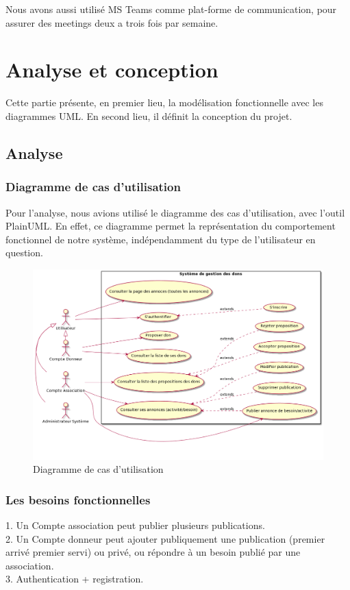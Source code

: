 Nous avons aussi utilisé MS Teams comme plat-forme de communication, pour assurer des meetings deux a trois fois par semaine.

\chapter{Analyse et conception}
Cette partie présente, en premier lieu, la modélisation
fonctionnelle avec les diagrammes UML.
En second lieu, il définit la conception du projet.
\section{Analyse}
\subsection{Diagramme de cas d'utilisation}
Pour l'analyse, nous avions utilisé le diagramme des cas d'utilisation, avec l'outil PlainUML. En effet, ce diagramme permet la représentation du comportement fonctionnel de notre système, indépendamment du type de l'utilisateur en question.


\begin{figure}[!h]
\begin{center}
\includegraphics[width=17cm]{DCU.png}
\caption{Diagramme de cas d’utilisation}
\end{center}
\end{figure}

\subsection{Les besoins fonctionnelles}

1. Un Compte association peut publier plusieurs publications.\\
2. Un Compte donneur peut ajouter publiquement une publication (premier arrivé premier servi) ou privé, ou répondre à un besoin publié par une association.\\
3. Authentication + registration.\\

